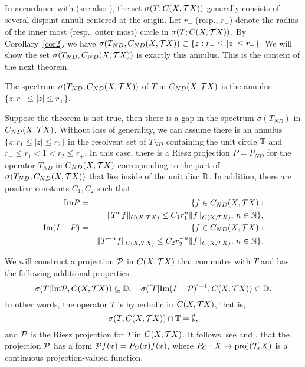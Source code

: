 In accordance with \cite{Mather} (see also \cite{CS,LS}),
the set $\sigma(T;{C(X,{{\cal{T}}X})})$ generally consists of
several disjoint annuli centered at the origin.
Let $r_-$ (resp., $r_+$) denote the radius of the inner most
(resp., outer most) circle in $\sigma(T; C(X,{{\cal{T}}X}))$.
By Corollary~\ref{cor2}, we have
$\sigma(T_{ND},C_{ND} (X,{{\cal{T}}X}))\subset \{z: r_-\leq |z|\leq r_+\}$.
We will show the set $\sigma(T_{ND},C_{ND} (X,{{\cal{T}}X}))$ is exactly
this  annulus. This is the content of the  next theorem.
\begin{thm}
The spectrum
$\sigma(T_{ND}, C_{ND} (X,{{\cal{T}}X}))$ of $T$ in  $C_{ND} (X,{{\cal{T}}X})$ is
the annulus
$\{z:r_{-}\le |z| \le r_{+} \}$.
\end{thm}
\begin{pf}
Suppose the theorem is not true, then there is a gap in the spectrum
$\sigma(T_{ND})$ in ${C_{ND}(X,{{\cal{T}}X})}$. Without
loss of generality,  we can assume
there is an annulus $\{z:r_1 \le |z| \le r_2\}$ in the resolvent
set of $T_{ND}$ containing the unit circle ${\Bbb{T}}$
and $r_- \le r_1 < 1< r_2\le r_{+}$.
In this case,
there is a Riesz projection
$P=P_{ND}$ for the
operator $T_{ND}$ in $C_{ND} (X,{{\cal{T}}X})$ corresponding to the
part of $\sigma(T_{ND}, C_{ND} (X,{{\cal{T}}X}))$ that lies
inside of the unit disc ${\Bbb{D}}$. In addition, there
are positive constants $C_1, C_2$ such that
\begin{eqnarray}
\hbox{\rm Im} P & = &
 \{f\in C_{ND}(X,{{\cal{T}}X}): \nonumber\\
&& \|T^nf\|_{{C(X,{{\cal{T}}X})}}
\le C_1 r^n_1\|f\|_{{C(X,{{\cal{T}}X})}},\, n\in{\Bbb{N}}\},\label{imp}\\
\hbox{\rm Im}{(I-P)}
& = & \{ f\in C_{ND}(X,{{\cal{T}}X}):  \nonumber\\
&& \| T^{-n}
f\|_{{C(X,{{\cal{T}}X})}} \le C_2
r^{-n}_2 \|f\|_{{C(X,{{\cal{T}}X})}},\, n\in {\Bbb{N}}\}.\label{imq}
\end{eqnarray}

We will construct a projection ${\cal{P}}$ in $C(X,{{\cal{T}}X})$
that commutes with
$T$ and has the following additional properties:
\begin{equation*}
\sigma (T|\hbox{\rm Im} {\cal{P}}, C(X,{{\cal{T}}X}))\subseteq {\Bbb{D}},\quad
\sigma ([T|\hbox{\rm Im}{(I-{\cal{P}})}]^{-1},C(X,{{\cal{T}}X}))\subset {\Bbb{D}}.
\end{equation*}
In other words, the operator $T$ is hyperbolic in $C(X,{{\cal{T}}X})$, that is,
\[\sigma(T,{C(X,{{\cal{T}}X})})\cap {\Bbb{T}}=\emptyset,\]
and ${\cal{P}}$ is the Riesz projection for $T$ in ${C(X,{{\cal{T}}X})}$.
It follows, see \cite{Mather} and
\cite{LS}, that the
projection ${\cal{P}}$
has a form
${\cal{P}} f (x) = P_C(x)f(x)$, where $P_C:X\to {\hbox{\rm proj}}({\cal T}_xX)$
is a continuous
projection-valued function.


\end{pf}
